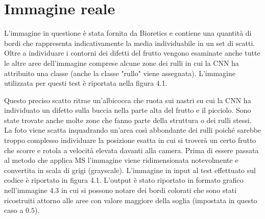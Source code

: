 \documentclass[12pt,a4paper]{report}
\begin{document}
{\section{Immagine reale}
L'immagine in questione è stata fornita da Bioretics e contiene una quantità di bordi che rappresenta indicativamente la media individuabile in un set di scatti. Oltre a individuare i contorni dei difetti del frutto vengono esaminate anche tutte le altre aree dell'immagine comprese alcune zone dei rulli in cui la CNN ha attribuito una classe (anche la classe "rullo" viene assegnata).
L'immagine utilizzata per questi test è riportata nella figura 4.1.
\begin{figure}[H]
\centering
\begin{floatrow}[1]
\end{floatrow}
\end{figure} 
Questo preciso scatto ritrae un'albicocca che ruota sui nastri su cui la CNN ha individuato un difetto sulla buccia nella parte alta del frutto e il picciolo. Sono state trovate anche molte zone che fanno parte della struttura o dei rulli stessi. La foto viene scatta inquadrando un'area così abbondante dei rulli poiché sarebbe troppo complesso individuare la posizione esatta in cui si troverà un certo frutto che scorre e rotola a velocità elevata davanti alla camera.
\newpage
Prima di essere passata al metodo che applica MS l'immagine viene ridimensionata notevolmente e convertita in scala di grigi (grayscale). L'immagine in input al test effettuato sul codice è riportato in figura 4.1.
L'output è stato riportato in formato grafico nell'immagine 4.3 in cui si possono notare dei bordi colorati che sono stati ricostruiti attorno alle aree con valore maggiore della soglia (impostata in questo caso a $0.5$).
\begin{figure}[H]
\centering
\begin{floatrow}[1]
\end{floatrow}
\end{figure} 

}
\end{document}
